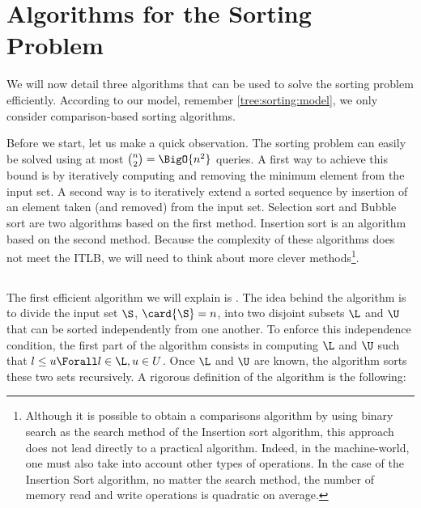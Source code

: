 \section{Algorithms for the Sorting Problem}
\label{tree:sorting:alg}

We will now detail three algorithms that can be used to solve the sorting
problem efficiently. According to our model, remember \ref{tree:sorting:model},
we only consider comparison-based sorting algorithms.


Before we start, let us make a quick observation. The sorting problem can
easily be solved using at most \(\binom{n}{2} = \BigO{n^2}\) queries. A first
way to achieve this bound is by iteratively computing and removing the minimum
element from the input set. A second way is to iteratively
extend a sorted sequence by insertion of an element taken (and removed) from
the input set. Selection sort and Bubble sort are two algorithms based on the
first method. Insertion sort is an algorithm based on the second method.
Because the complexity of these algorithms does not meet the ITLB, we will need
to think about more clever methods\footnote{Although it is possible to obtain
a  comparisons algorithm by using binary search as the search
method of the Insertion sort algorithm, this approach does not lead directly to
a practical algorithm. Indeed, in the machine-world, one must also take into
account other types of operations. In the case of the Insertion Sort algorithm,
no matter the search method, the number of memory read and write operations is
quadratic on average.}.

\subsection*{\quicksort}

The first efficient algorithm we will explain is \quicksort \cite{hoare:1962}.
The idea behind the \quicksort algorithm is to divide the input set \(\S\),
\(\card{\S} = n\), into two disjoint subsets \(\L\) and \(\U\) that can be
sorted independently from one another. To enforce this independence condition,
the first part of the algorithm consists in computing \(\L\) and \(\U\) such
that \(l \le u \Forall l \in \L, u \in U\). Once \(\L\) and \(\U\) are known,
the algorithm sorts these two sets recursively. A rigorous definition of the
algorithm is the following:

